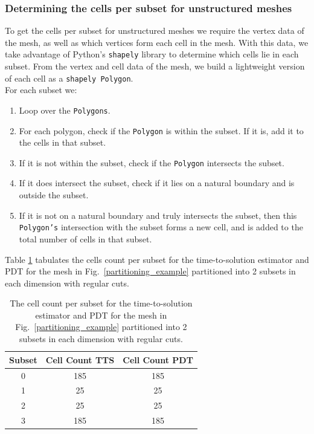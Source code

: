 \subsubsection{Determining the cells per subset for unstructured meshes}
To get the cells per subset for unstructured meshes we require the vertex data of the mesh, as well as which vertices form each cell in the mesh.
With this data, we take advantage of Python's {\tt shapely} library \cite{shapely} to determine which cells lie in each subset. From the vertex and cell data of the mesh, we build a lightweight version of each cell as a {\tt shapely Polygon}.\\
\noindent
For each subset we:
\begin{enumerate}
  \item Loop over the {\tt Polygons}.
  \item For each polygon, check if the {\tt Polygon} is within the subset. If it is, add it to the cells in that subset.
  \item If it is not within the subset, check if the {\tt Polygon} intersects the subset.
  \item If it does intersect the subset, check if it lies on a natural boundary and is outside the subset.
  \item If it is not on a natural boundary and truly intersects the subset, then this {\tt Polygon's} intersection with the subset forms a new cell,  and is added to the total number of cells in that subset.
\end{enumerate}
Table \ref{2x2_cellcount} tabulates the cells count per subset for the time-to-solution estimator and PDT for the mesh in Fig.~\ref{partitioning_example} partitioned into 2 subsets in each dimension with regular cuts.
\begin{table}[H]
\centering
\caption{The cell count per subset for the time-to-solution estimator and PDT for the mesh in Fig.~\ref{partitioning_example} partitioned into 2 subsets in each dimension with regular cuts.}
\label{2x2_cellcount}
\begin{tabular}{c|c|c}
\textbf{Subset} & \textbf{Cell Count TTS} & \textbf{Cell Count PDT} \\ \hline
0 & 185 & 185 \\ \hline
1 & 25 & 25 \\ \hline
2 & 25 & 25 \\ \hline
3 & 185 & 185
\end{tabular}
\end{table}

